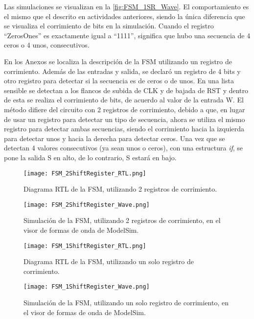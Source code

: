 Las simulaciones se visualizan en la \autoref{fig:FSM_1SR_Wave}. El comportamiento es el mismo que el descrito en actividades anteriores, siendo la única diferencia que se visualiza el corrimiento de bits en la simulación. Cuando el registro ``ZerosOnes'' es exactamente igual a ``1111'', significa que hubo una secuencia de 4 ceros o 4 unos, consecutivos.

En los Anexos se localiza la descripción de la FSM utilizando un registro de corrimiento. Además de las entradas y salida, se declaró un registro de 4 bits y otro registro para detectar si la secuencia es de ceros o de unos. En una lista sensible se detectan a los flancos de subida de CLK y de bajada de RST y dentro de esta se realiza el corrimiento de bits, de acuerdo al valor de la entrada W. El método difiere del circuito con 2 registros de corrimiento, debido a que, en lugar de usar un registro para detectar un tipo de secuencia, ahora se utiliza el mismo registro para detectar ambas secuencias, siendo el corrimiento hacia la izquierda para detectar unos y hacia la derecha para detectar ceros. Una vez que se detectan 4 valores consecutivos (ya sean unos o ceros), con una estructura \textit{if}, se pone la salida S en alto, de lo contrario, S estará en bajo.

\begin{figure}[ht]
	\centering
	\texttt{[image: FSM\_2ShiftRegister\_RTL.png]}
	\caption{Diagrama RTL de la FSM, utilizando 2 registros de corrimiento. \label{fig:FSM_2SR_RTL}}
\end{figure}

\begin{figure}[ht]
	\centering
	\texttt{[image: FSM\_2ShiftRegister\_Wave.png]}
	\caption{Simulación de la FSM, utilizando 2 registros de corrimiento, en el visor de formas de onda de ModelSim. \label{fig:FSM_2SR_Wave}}
\end{figure}

\begin{figure}[ht]
	\centering
	\texttt{[image: FSM\_1ShiftRegister\_RTL.png]}
	\caption{Diagrama RTL de la FSM, utilizando un solo registro de corrimiento. \label{fig:FSM_1SR_RTL}}
\end{figure}

\begin{figure}[ht]
	\centering
	\texttt{[image: FSM\_1ShiftRegister\_Wave.png]}
	\caption{Simulación de la FSM, utilizando un solo registro de corrimiento, en el visor de formas de onda de ModelSim. \label{fig:FSM_1SR_Wave}}
\end{figure}